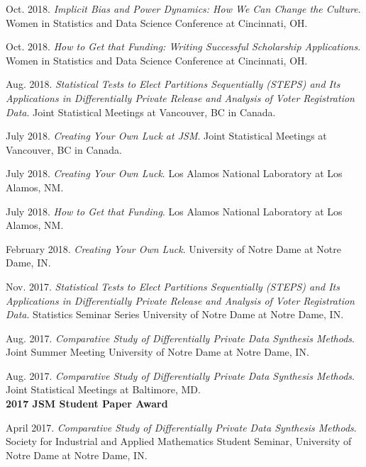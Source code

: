 \documentclass[11pt, letterpaper, roman]{moderncv} %
\begin{document}
\begin{etaremune}[topsep=0pt, itemsep=5pt, partopsep=0pt, parsep=0pt]
  \item Oct. 2018. \textit{Implicit Bias and Power Dynamics: How We Can Change the Culture}. Women in Statistics and Data Science Conference at Cincinnati, OH.

  \item Oct. 2018. \textit{How to Get that Funding: Writing Successful Scholarship Applications}. Women in Statistics and Data Science Conference at Cincinnati, OH.

  \item Aug. 2018. \textit{Statistical Tests to Elect Partitions Sequentially (STEPS) and Its Applications in Differentially Private Release and Analysis of Voter Registration Data}. Joint Statistical Meetings at Vancouver, BC in Canada.
  
  \item July 2018. \textit{Creating Your Own Luck at JSM}. Joint Statistical Meetings at Vancouver, BC in Canada.
  
  \item July 2018. \textit{Creating Your Own Luck}. Los Alamos National Laboratory at Los Alamos, NM.
  
  \item July 2018. \textit{How to Get that Funding}. Los Alamos National Laboratory at Los Alamos, NM.
  
  \item February 2018. \textit{Creating Your Own Luck}. University of Notre Dame at Notre Dame, IN.
  
  \item Nov. 2017. \textit{Statistical Tests to Elect Partitions Sequentially (STEPS) and Its Applications in Differentially Private Release and Analysis of Voter Registration Data}. Statistics Seminar Series University of Notre Dame at Notre Dame, IN.
  
  \item Aug. 2017. \textit{Comparative Study of Differentially Private Data Synthesis Methods}. Joint Summer Meeting University of Notre Dame at Notre Dame, IN.

  \item Aug. 2017. \textit{Comparative Study of Differentially Private Data Synthesis Methods}. Joint Statistical Meetings at Baltimore, MD.\\
  \textbf{2017 JSM Student Paper Award}
  
   \item April 2017. \textit{Comparative Study of Differentially Private Data Synthesis Methods}. Society for Industrial and Applied Mathematics Student Seminar, University of Notre Dame at Notre Dame, IN.
  

\end{etaremune}
\end{document}
